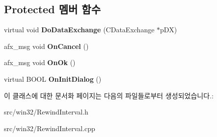 \subsection*{Protected 멤버 함수}
\begin{DoxyCompactItemize}
\item 
\mbox{\label{class_rewind_interval_a5edc01838b4b72a8aef111e9c1103d1b}} 
virtual void {\bfseries Do\+Data\+Exchange} (C\+Data\+Exchange $\ast$p\+DX)
\item 
\mbox{\label{class_rewind_interval_a8aecd163bdd5ac7472b24976de094fcc}} 
afx\+\_\+msg void {\bfseries On\+Cancel} ()
\item 
\mbox{\label{class_rewind_interval_a1375930198e073532314da8b6ed40286}} 
afx\+\_\+msg void {\bfseries On\+Ok} ()
\item 
\mbox{\label{class_rewind_interval_ad108898e1ce2a68db6e1478225e8f842}} 
virtual B\+O\+OL {\bfseries On\+Init\+Dialog} ()
\end{DoxyCompactItemize}


이 클래스에 대한 문서화 페이지는 다음의 파일들로부터 생성되었습니다.\+:\begin{DoxyCompactItemize}
\item 
src/win32/Rewind\+Interval.\+h\item 
src/win32/Rewind\+Interval.\+cpp\end{DoxyCompactItemize}
